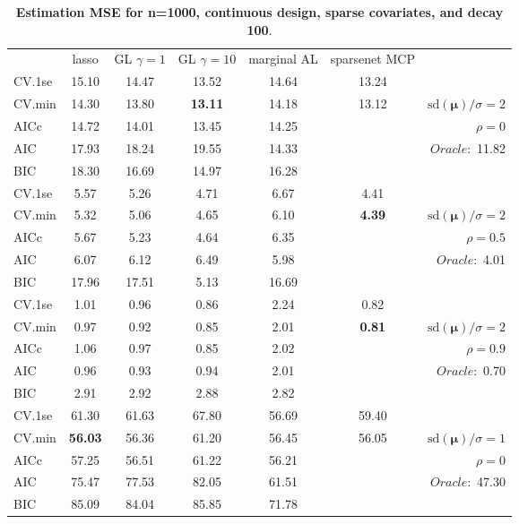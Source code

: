 \clearpage
\begin{table}\vspace{-.5cm}
\caption[l]{ { \bf Estimation MSE for n=1000, continuous design, 
sparse covariates, and  decay  100}.}
\vspace{-.5cm}
\footnotesize{}
\begin{center}
\begin{tabular}{l*{5}{c}|r}
& lasso & GL $\gamma=1$ & GL $\gamma=10$ & marginal AL & sparsenet MCP  & \\
 \cline{1-7}
CV.1se & 15.10 & 14.47 & 13.52 & 14.64 & 13.24 & \\
CV.min & 14.30 & 13.80 & {\bf 13.11} & 14.18 & 13.12 &  $\mathrm{sd}(\mathbf{\mu})/\sigma=2$ \\
AICc & 14.72 & 14.01 & 13.45 & 14.25 & & $\rho=0$ \\
AIC & 17.93 & 18.24 & 19.55 & 14.33 & &  \multirow{2}{*}{$Oracle: $ 11.82} \\
BIC & 18.30 & 16.69 & 14.97 & 16.28 & &  \\
 \hline 
CV.1se & 5.57 & 5.26 & 4.71 & 6.67 & 4.41 & \\
CV.min & 5.32 & 5.06 & 4.65 & 6.10 & {\bf 4.39} &  $\mathrm{sd}(\mathbf{\mu})/\sigma=2$ \\
AICc & 5.67 & 5.23 & 4.64 & 6.35 & & $\rho=0.5$ \\
AIC & 6.07 & 6.12 & 6.49 & 5.98 & &  \multirow{2}{*}{$Oracle: $ 4.01} \\
BIC & 17.96 & 17.51 & 5.13 & 16.69 & &  \\
 \hline 
CV.1se & 1.01 & 0.96 & 0.86 & 2.24 & 0.82 & \\
CV.min & 0.97 & 0.92 & 0.85 & 2.01 & {\bf 0.81} &  $\mathrm{sd}(\mathbf{\mu})/\sigma=2$ \\
AICc & 1.06 & 0.97 & 0.85 & 2.02 & & $\rho=0.9$ \\
AIC & 0.96 & 0.93 & 0.94 & 2.01 & &  \multirow{2}{*}{$Oracle: $ 0.70} \\
BIC & 2.91 & 2.92 & 2.88 & 2.82 & &  \\
 \hline 
CV.1se & 61.30 & 61.63 & 67.80 & 56.69 & 59.40 & \\
CV.min & {\bf 56.03} & 56.36 & 61.20 & 56.45 & 56.05 &  $\mathrm{sd}(\mathbf{\mu})/\sigma=1$ \\
AICc & 57.25 & 56.51 & 61.22 & 56.21 & & $\rho=0$ \\
AIC & 75.47 & 77.53 & 82.05 & 61.51 & &  \multirow{2}{*}{$Oracle: $ 47.30} \\
BIC & 85.09 & 84.04 & 85.85 & 71.78 & &  \\

\end{tabular}
\end{center}
\end{table}
